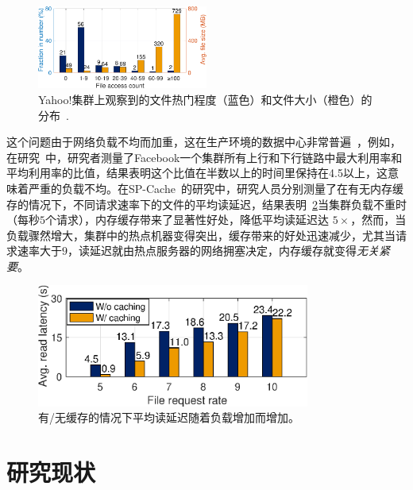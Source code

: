 \begin{figure}[t]
\centering
   \includegraphics[width=0.5\textwidth]{img/introduction/Yahoo_pop-eps-converted-to.pdf}
   \caption{Yahoo!集群上观察到的文件热门程度（蓝色）和文件大小（橙色）的分布~\cite{yahoo!_trace}.}
\label{fig:Yahoo_trace}
\vspace{-.1in}
\end{figure}

\par 这个问题由于网络负载不均而加重，这在生产环境的数据中心非常普遍~\cite{Kandula09a,Chowdhury13a,Greenberg09a,rashmi2016ec}，例如，在研究~\cite{rashmi2016ec}中，研究者测量了Facebook一个集群所有上行和下行链路中最大利用率和平均利用率的比值，结果表明这个比值在半数以上的时间里保持在4.5以上，这意味着严重的负载不均。在SP-Cache~\cite{Yu:2018:SLR:3291656.3291658}的研究中，研究人员分别测量了在有无内存缓存的情况下，不同请求速率下的文件的平均读延迟，结果表明~\ref{fig:impact_of_imbalance}当集群负载不重时（每秒$5$个请求），内存缓存带来了显著性好处，降低平均读延迟达 $5\times$，然而，当负载骤然增大，集群中的热点机器变得突出，缓存带来的好处迅速减少，尤其当请求速率大于$9$，读延迟就由热点服务器的网络拥塞决定，内存缓存就变得\emph{无关紧要}。

\begin{figure}[t]
    \centering
    \includegraphics[width=0.8\textwidth]{img/introduction/latencies_under_imbalance}
    \caption{有/无缓存的情况下平均读延迟随着负载增加而增加。}
    \label{fig:impact_of_imbalance}
    \vspace{-.15in}
\end{figure}

\section{研究现状}

